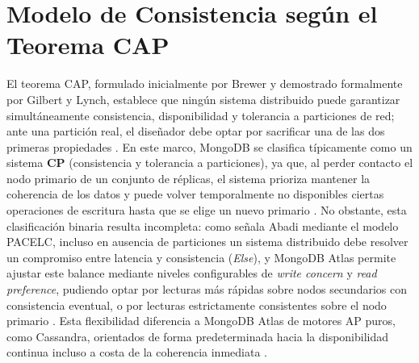 \documentclass[10pt,journal]{IEEEtran}
\begin{document}
\section{Modelo de Consistencia seg\'un el Teorema CAP}
El teorema CAP, formulado inicialmente por Brewer y demostrado formalmente por Gilbert y Lynch, establece que ning\'un sistema distribuido puede garantizar simult\'aneamente consistencia, disponibilidad y tolerancia a particiones de red; ante una partici\'on real, el dise\~nador debe optar por sacrificar una de las dos primeras propiedades \cite{brewer2000towards,gilbert2002brewers}. En este marco, MongoDB se clasifica t\'ipicamente como un sistema \textbf{CP} (consistencia y tolerancia a particiones), ya que, al perder contacto el nodo primario de un conjunto de r\'eplicas, el sistema prioriza mantener la coherencia de los datos y puede volver temporalmente no disponibles ciertas operaciones de escritura hasta que se elige un nuevo primario \cite{felizzi2024sharding}. No obstante, esta clasificaci\'on binaria resulta incompleta: como se\~nala Abadi mediante el modelo PACELC, incluso en ausencia de particiones un sistema distribuido debe resolver un compromiso entre latencia y consistencia (\textit{Else}), y MongoDB Atlas permite ajustar este balance mediante niveles configurables de \textit{write concern} y \textit{read preference}, pudiendo optar por lecturas m\'as r\'apidas sobre nodos secundarios con consistencia eventual, o por lecturas estrictamente consistentes sobre el nodo primario \cite{abadi2012consistency}. Esta flexibilidad diferencia a MongoDB Atlas de motores AP puros, como Cassandra, orientados de forma predeterminada hacia la disponibilidad continua incluso a costa de la coherencia inmediata \cite{dasilva2023evaluation}.
\end{document}
